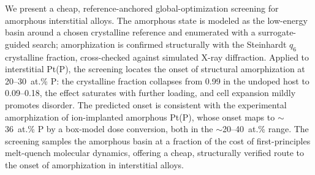 
We present a cheap, reference-anchored global-optimization screening for
amorphous interstitial alloys. The amorphous state is modeled as the
low-energy basin around a chosen crystalline reference and enumerated with a
surrogate-guided search; amorphization is confirmed structurally with the
Steinhardt $q_6$ crystalline fraction, cross-checked against simulated X-ray
diffraction. Applied to interstitial Pt(P), the screening locates the onset
of structural amorphization at 20--30~at.\% P: the crystalline fraction
collapses from 0.99 in the undoped host to 0.09--0.18, the effect saturates
with further loading, and cell expansion mildly promotes disorder. The
predicted onset is consistent with the experimental amorphization of
ion-implanted amorphous Pt(P), whose onset maps to $\sim$36~at.\% P by a
box-model dose conversion, both in the $\sim$20--40~at.\% range. The
screening samples the amorphous basin at a fraction of the cost of
first-principles melt-quench molecular dynamics, offering a cheap,
structurally verified route to the onset of amorphization in interstitial
alloys.
